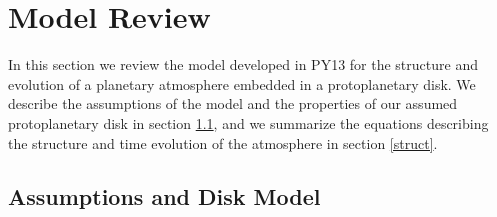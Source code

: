 \documentclass[apj]{emulateapj}
\begin{document}





\section{Model Review}
\label{sec2}


In this section we review the model developed in PY13 for the structure and evolution of a planetary atmosphere embedded in a protoplanetary disk. We describe the assumptions of the model and the properties of our assumed protoplanetary disk in section \ref{model}, and we summarize the equations describing the structure and time evolution of the atmosphere in section \ref{struct}.  

\subsection{Assumptions and Disk Model}
\label{model}
\end{document}
